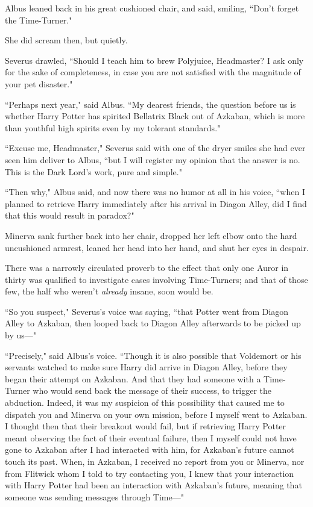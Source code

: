 Albus leaned back in his great cushioned chair, and said, smiling, ``Don't forget the Time-Turner."

She did scream then, but quietly.

Severus drawled, ``Should I teach him to brew Polyjuice, Headmaster? I ask only for the sake of completeness, in case you are not satisfied with the magnitude of your pet disaster."

``Perhaps next year," said Albus. ``My dearest friends, the question before us is whether Harry Potter has spirited Bellatrix Black out of Azkaban, which is more than youthful high spirits even by my tolerant standards."

``Excuse me, Headmaster," Severus said with one of the dryer smiles she had ever seen him deliver to Albus, ``but I will register my opinion that the answer is no. This is the Dark Lord's work, pure and simple."

``Then why," Albus said, and now there was no humor at all in his voice, ``when I planned to retrieve Harry immediately after his arrival in Diagon Alley, did I find that this would result in paradox?"

Minerva sank further back into her chair, dropped her left elbow onto the hard uncushioned armrest, leaned her head into her hand, and shut her eyes in despair.

There was a narrowly circulated proverb to the effect that only one Auror in thirty was qualified to investigate cases involving Time-Turners; and that of those few, the half who weren't \emph{already} insane, soon would be.

``So you suspect," Severus's voice was saying, ``that Potter went from Diagon Alley to Azkaban, then looped back to Diagon Alley afterwards to be picked up by us—"

``Precisely," said Albus's voice. ``Though it is also possible that Voldemort or his servants watched to make sure Harry did arrive in Diagon Alley, before they began their attempt on Azkaban. And that they had someone with a Time-Turner who would send back the message of their success, to trigger the abduction. Indeed, it was my suspicion of this possibility that caused me to dispatch you and Minerva on your own mission, before I myself went to Azkaban. I thought then that their breakout would fail, but if retrieving Harry Potter meant observing the fact of their eventual failure, then I myself could not have gone to Azkaban after I had interacted with him, for Azkaban's future cannot touch its past. When, in Azkaban, I received no report from you or Minerva, nor from Flitwick whom I told to try contacting you, I knew that your interaction with Harry Potter had been an interaction with Azkaban's future, meaning that someone was sending messages through Time—"

